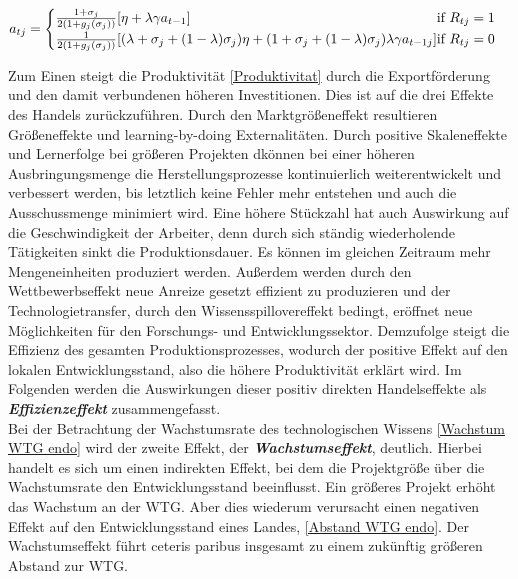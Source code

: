 	\begin{equation}
		a_{tj}=\begin{cases}\frac{1+\sigma_j}{2(1+g_j(\sigma_j))}[\eta+\lambda \gamma a_{t-1}] \hfill\text{if  } R_{tj}=1 \\
		\frac{1}{2(1+g_j(\sigma_j))}[(\lambda+\sigma_j+(1-\lambda)\sigma_j)\eta+(1+\sigma_j+(1-\lambda)\sigma_j)\lambda\gamma a_{t-1 j}] \hfill\text{if   }R_{tj}=0
		\end{cases}\label{Abstand WTG endo}
	\end{equation}


Zum Einen steigt die Produktivität \eqref{Produktivitat} durch die Exportförderung und den damit verbundenen höheren Investitionen. Dies ist auf die drei Effekte des Handels zurückzuführen. Durch den Marktgrößeneffekt resultieren Größeneffekte und learning-by-doing Externalitäten. Durch positive Skaleneffekte und Lernerfolge bei größeren Projekten dkönnen bei einer höheren Ausbringungsmenge die Herstellungsprozesse kontinuierlich weiterentwickelt und verbessert werden, bis letztlich keine Fehler mehr entstehen und auch die Ausschussmenge minimiert wird. Eine höhere Stückzahl hat auch Auswirkung auf die Geschwindigkeit der Arbeiter, denn durch sich ständig wiederholende Tätigkeiten sinkt die Produktionsdauer. Es können im gleichen Zeitraum mehr Mengeneinheiten produziert werden. Außerdem werden durch den Wettbewerbseffekt neue Anreize gesetzt effizient zu produzieren und der Technologietransfer, durch den Wissensspillovereffekt bedingt, eröffnet neue Möglichkeiten für den Forschungs- und Entwicklungssektor. Demzufolge steigt die Effizienz des gesamten Produktionsprozesses, wodurch der positive Effekt auf den lokalen Entwicklungsstand, also die höhere Produktivität erklärt wird. Im Folgenden werden die Auswirkungen dieser positiv direkten Handelseffekte als \textbf{\textit{Effizienzeffekt}} zusammengefasst. \\


Bei der Betrachtung der Wachstumsrate des technologischen Wissens \eqref{Wachstum WTG endo} wird der zweite Effekt, der \textbf{\textit{Wachstumseffekt}}, deutlich. Hierbei handelt es sich um einen indirekten Effekt, bei dem die Projektgröße über die Wachstumsrate den Entwicklungsstand beeinflusst. Ein größeres Projekt erhöht das Wachstum an der WTG. Aber dies wiederum verursacht einen negativen Effekt auf den Entwicklungsstand eines Landes, \eqref{Abstand WTG endo}. Der Wachstumseffekt führt ceteris paribus insgesamt zu einem zukünftig größeren Abstand zur WTG.\\



